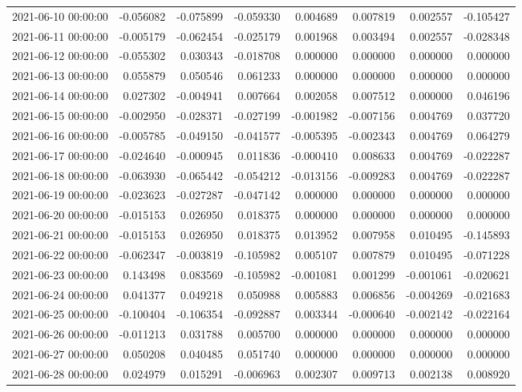 \begin{tabular}{lrrrrrrr}
2021-06-10 00:00:00 & -0.056082 & -0.075899 & -0.059330 & 0.004689 & 0.007819 & 0.002557 & -0.105427 \\
2021-06-11 00:00:00 & -0.005179 & -0.062454 & -0.025179 & 0.001968 & 0.003494 & 0.002557 & -0.028348 \\
2021-06-12 00:00:00 & -0.055302 & 0.030343 & -0.018708 & 0.000000 & 0.000000 & 0.000000 & 0.000000 \\
2021-06-13 00:00:00 & 0.055879 & 0.050546 & 0.061233 & 0.000000 & 0.000000 & 0.000000 & 0.000000 \\
2021-06-14 00:00:00 & 0.027302 & -0.004941 & 0.007664 & 0.002058 & 0.007512 & 0.000000 & 0.046196 \\
2021-06-15 00:00:00 & -0.002950 & -0.028371 & -0.027199 & -0.001982 & -0.007156 & 0.004769 & 0.037720 \\
2021-06-16 00:00:00 & -0.005785 & -0.049150 & -0.041577 & -0.005395 & -0.002343 & 0.004769 & 0.064279 \\
2021-06-17 00:00:00 & -0.024640 & -0.000945 & 0.011836 & -0.000410 & 0.008633 & 0.004769 & -0.022287 \\
2021-06-18 00:00:00 & -0.063930 & -0.065442 & -0.054212 & -0.013156 & -0.009283 & 0.004769 & -0.022287 \\
2021-06-19 00:00:00 & -0.023623 & -0.027287 & -0.047142 & 0.000000 & 0.000000 & 0.000000 & 0.000000 \\
2021-06-20 00:00:00 & -0.015153 & 0.026950 & 0.018375 & 0.000000 & 0.000000 & 0.000000 & 0.000000 \\
2021-06-21 00:00:00 & -0.015153 & 0.026950 & 0.018375 & 0.013952 & 0.007958 & 0.010495 & -0.145893 \\
2021-06-22 00:00:00 & -0.062347 & -0.003819 & -0.105982 & 0.005107 & 0.007879 & 0.010495 & -0.071228 \\
2021-06-23 00:00:00 & 0.143498 & 0.083569 & -0.105982 & -0.001081 & 0.001299 & -0.001061 & -0.020621 \\
2021-06-24 00:00:00 & 0.041377 & 0.049218 & 0.050988 & 0.005883 & 0.006856 & -0.004269 & -0.021683 \\
2021-06-25 00:00:00 & -0.100404 & -0.106354 & -0.092887 & 0.003344 & -0.000640 & -0.002142 & -0.022164 \\
2021-06-26 00:00:00 & -0.011213 & 0.031788 & 0.005700 & 0.000000 & 0.000000 & 0.000000 & 0.000000 \\
2021-06-27 00:00:00 & 0.050208 & 0.040485 & 0.051740 & 0.000000 & 0.000000 & 0.000000 & 0.000000 \\
2021-06-28 00:00:00 & 0.024979 & 0.015291 & -0.006963 & 0.002307 & 0.009713 & 0.002138 & 0.008920 \\

\end{tabular}
